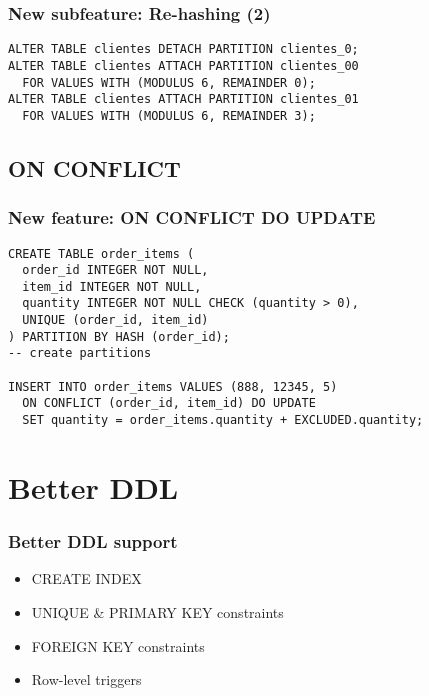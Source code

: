 \begin{frame}[fragile]
  \frametitle{New subfeature: Re-hashing (2)}

  \begin{lstlisting}
ALTER TABLE clientes DETACH PARTITION clientes_0;
ALTER TABLE clientes ATTACH PARTITION clientes_00
  FOR VALUES WITH (MODULUS 6, REMAINDER 0);
ALTER TABLE clientes ATTACH PARTITION clientes_01
  FOR VALUES WITH (MODULUS 6, REMAINDER 3);
  \end{lstlisting}
\end{frame}

\subsection{ON CONFLICT}
\begin{frame}[fragile]
  \frametitle{New feature: ON CONFLICT DO UPDATE}

\begin{lstlisting}
CREATE TABLE order_items (
  order_id INTEGER NOT NULL,
  item_id INTEGER NOT NULL,
  quantity INTEGER NOT NULL CHECK (quantity > 0),
  UNIQUE (order_id, item_id)
) PARTITION BY HASH (order_id);
-- create partitions

INSERT INTO order_items VALUES (888, 12345, 5)
  ON CONFLICT (order_id, item_id) DO UPDATE
  SET quantity = order_items.quantity + EXCLUDED.quantity;
\end{lstlisting}

\end{frame}

\section{Better DDL}

\begin{frame}
  \frametitle{Better DDL support}

  \begin{itemize}
    \item CREATE INDEX
    \item UNIQUE \& PRIMARY KEY constraints
    \item FOREIGN KEY constraints
    \item Row-level triggers
  \end{itemize}
\end{frame}

